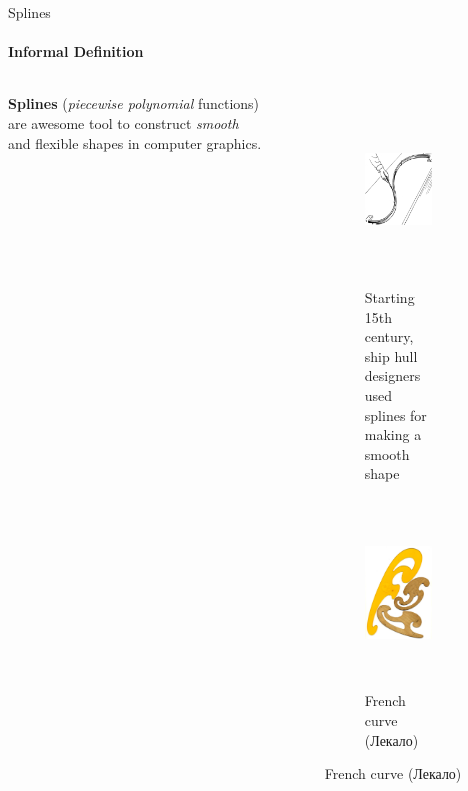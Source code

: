 \documentclass[aspectratio=169,notes]{beamer}
\begin{document}
\begin{frame}[t]{Splines}
\framesubtitle{Informal Definition}
    \begin{columns}[T,onlytextwidth]
        \begin{column}{0.39\textwidth}
            \textbf{Splines} (\textit{piecewise polynomial} functions) are awesome tool to construct \textit{smooth} and flexible shapes in computer graphics.
        \end{column}
        \begin{column}{0.59\textwidth}
            \vspace{-1cm}
            \begin{figure}[H]
                \begin{subfigure}[b]{0.49\textwidth}
                    \centering\includegraphics[height=5cm,width=1\textwidth,keepaspectratio]{spline_ship.png}
                    \caption*{Starting 15th century, ship hull designers used splines for making a smooth shape}
                    \label{fig:spline_ship.png}
                \end{subfigure}
                \begin{subfigure}[b]{0.49\textwidth}
                    \centering\includegraphics[height=5cm,width=1\textwidth,keepaspectratio]{lekalo.jpg}
                    \caption*{French curve (Лекало)}
                    \label{fig:lekalo.jpg}
                \end{subfigure}
            \end{figure}
        \end{column}
    \end{columns}
\end{frame}
\end{document}
